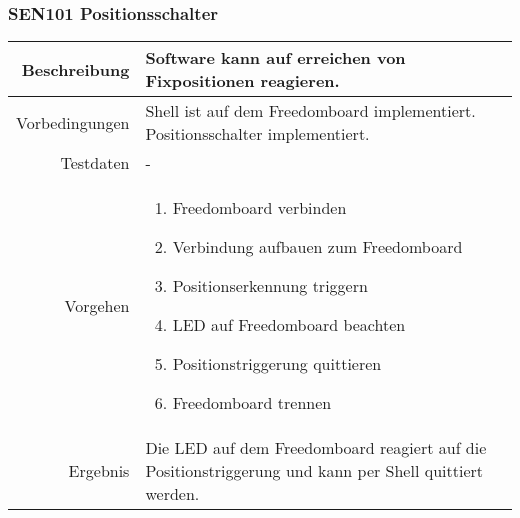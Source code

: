 \subsubsection{SEN101 Positionsschalter}
\begin{table}[h!]
	\renewcommand{\arraystretch}{1.5}
	\begin{tabular}{|r|p{14cm}|}
		\hline Beschreibung	&
			Software kann auf erreichen von Fixpositionen reagieren. \\ 
		\hline Vorbedingungen	&
			Shell ist auf dem Freedomboard implementiert.
			Positionsschalter implementiert. \\ 
		\hline Testdaten	& - \\ 
		\hline Vorgehen		& 
		\begin{enumerate}
			\item Freedomboard verbinden
			\item Verbindung aufbauen zum Freedomboard
			\item Positionserkennung triggern
			\item LED auf Freedomboard beachten
			\item Positionstriggerung quittieren
			\item Freedomboard trennen
		\end{enumerate} \\ 
		\hline Ergebnis 	&
			Die LED auf dem Freedomboard reagiert auf die
			Positionstriggerung und kann per Shell quittiert werden.\\ 
		\hline 
	\end{tabular}
\end{table}


